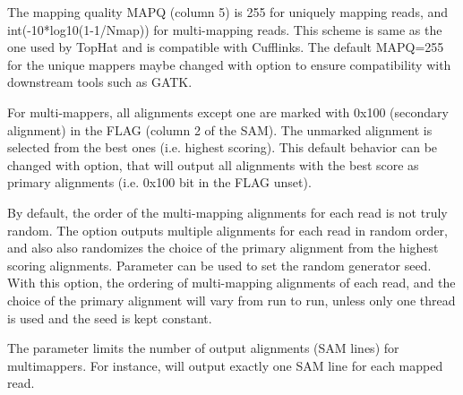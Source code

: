 \documentclass[12pt]{article}
\begin{document}
The mapping quality MAPQ (column 5) is 255 for uniquely mapping reads, and int(-10*log10(1-1/Nmap))  for multi-mapping reads. This scheme is same as the one used by TopHat and is compatible with Cufflinks. The default MAPQ=255 for the unique mappers maybe changed with   option to ensure compatibility with downstream tools such as GATK.

For multi-mappers, all alignments except one are marked with 0x100 (secondary alignment) in the FLAG (column 2 of the SAM). The unmarked alignment is selected from the best ones (i.e. highest scoring). This default behavior can be changed with   option, that will output all alignments with the best score as primary alignments (i.e. 0x100 bit in the FLAG unset).

By default, the order of the multi-mapping alignments for each read is not truly random.
The   option outputs multiple alignments for each read in random order, and also also randomizes the choice of the primary alignment from the highest scoring alignments. Parameter  can be used to set the random generator seed. With this option, the ordering of multi-mapping alignments of each read, and the choice of the primary alignment will vary from run to run, unless only one thread is used and the seed is kept constant.

The  parameter limits the number of output alignments (SAM lines) for multimappers. For instance,   will output exactly one SAM line for each mapped read.
\end{document}
